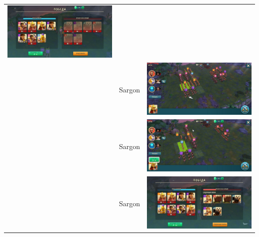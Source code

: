 \begin{longtable}{|c|c|c|}
    \includegraphics[width=0.75\linewidth]{./parts/media/TreasureHunt/39/sargon/photo_2022-04-07_13-18-31.jpg} \\
    & Sargon &
    \includegraphics[width=0.75\linewidth]{./parts/media/TreasureHunt/39/sargon/photo_2022-04-07_13-18-09.jpg} \\
    & Sargon &
    \includegraphics[width=0.75\linewidth]{./parts/media/TreasureHunt/39/sargon/photo_2022-04-07_13-18-26.jpg} \\
    & Sargon &
    \includegraphics[width=0.75\linewidth]{./parts/media/TreasureHunt/39/sargon/photo_2022-04-07_13-18-21.jpg} \\

\end{longtable}
